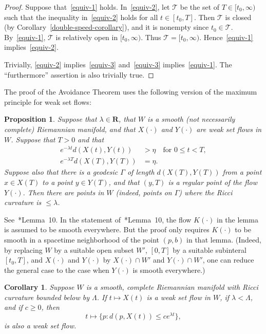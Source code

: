 \documentclass{amsart}
\newcommand{\Tt}{\mathcal{T}}
\newcommand{\RR}{\mathbf{R}}  %
\newtheorem{corollary}  [theorem]     {Corollary}
\newtheorem{proposition}       [theorem]       {Proposition}
\theoremstyle{definition}
\theoremstyle{definition}
\begin{document}
\begin{proof}
Suppose that~\eqref{equiv-1} holds.  In~\eqref{equiv-2}, let $\Tt$ be the set of $T\in [t_0,\infty)$ such that the 
 inequality in~\eqref{equiv-2}
 holds for all $t\in [t_0,T]$.
Then $\Tt$ is closed (by Corollary~\ref{double-speed-corollary}),
  and it is nonempty since $t_0\in \Tt$.
  By~\eqref{equiv-1}, $\Tt$ is relatively open in $[t_0,\infty)$.
Thus $\Tt=[t_0,\infty)$. 
Hence~\eqref{equiv-1} implies~\eqref{equiv-2}.

Trivially, \eqref{equiv-2} implies~\eqref{equiv-3} and~\eqref{equiv-3} implies~\eqref{equiv-1}. 
 The ``furthermore'' assertion is also trivially true.
\end{proof}


The proof of the Avoidance Theorem uses the following version of the maximum principle 
for weak set flows:

\begin{proposition}\label{key-fact}
Suppose that $\lambda\in \RR$,  
 that $W$ is a smooth (not necessarily complete)
Riemannian manifold, and 
    that $X(\cdot)$ and $Y(\cdot)$ are weak set flows in $W$. 
  Suppose that $T>0$ and that
\begin{align*}
   e^{-\lambda t} d(X(t),Y(t)) &> \eta \quad\text{for $0\le t<T$}, \\
   e^{-\lambda T} d(X(T),Y(T)) &= \eta.
\end{align*}
Suppose also that there is a geodesic $\Gamma$ of length $d(X(T),Y(T))$
from a point $x\in X(T)$ to a point $y\in Y(T)$, 
and that $(y,T)$ is a regular point of the flow $Y(\cdot)$.
Then there are points in $W$  (indeed, points on $\Gamma$) where the Ricci curvature is $\le \lambda$.
\end{proposition}

See~\cite{hershkovits-w-avoid}*{Lemma~10}.
In the statement of~\cite{hershkovits-w-avoid}*{Lemma~10},
the flow $K(\cdot)$ in the lemma is assumed to be smooth everywhere. But
the proof only requires $K(\cdot)$ to be smooth in a spacetime neighborhood of the point $(p,b)$
in that lemma.  
(Indeed, by replacing $W$ by a suitable open subset $W'$,
$[0,T]$ by a suitable subinteral $[t_0,T]$, and $X(\cdot)$ and $Y(\cdot)$ by
$X(\cdot)\cap W'$ and $Y(\cdot)\cap W'$, one can reduce the general case to the case
when $Y(\cdot)$ is smooth everywhere.)

\begin{corollary}\label{key-corollary}
Suppose $W$ is a smooth, complete Riemannian manifold with Ricci curvature bounded
below by $\Lambda$.    If $t\mapsto X(t)$ is a weak set flow in $W$,
if $\lambda<\Lambda$, and if $c\ge 0$, then
\[
 t\mapsto \{p: d(p,X(t)) \le ce^{\lambda t} \},
\]
is also a weak set flow.
\end{corollary}
\end{document}
